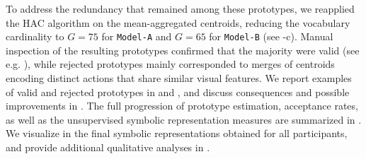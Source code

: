         To address the redundancy that remained among these prototypes, we reapplied the HAC algorithm on the mean-aggregated centroids, reducing the vocabulary cardinality to $G = 75$ for \texttt{Model-A} and $G = 65$ for \texttt{Model-B} (see -c). Manual inspection of the resulting prototypes confirmed that the majority were valid (see e.g. ), while rejected prototypes mainly corresponded to merges of centroids encoding distinct actions that share similar visual features. We report examples of valid and rejected prototypes in  and , and discuss consequences and possible improvements in . The full progression of prototype estimation,  acceptance rates, as well as the unsupervised symbolic representation measures are summarized in . We visualize in  the final symbolic representations obtained for all participants, and provide additional qualitative analyses in .


